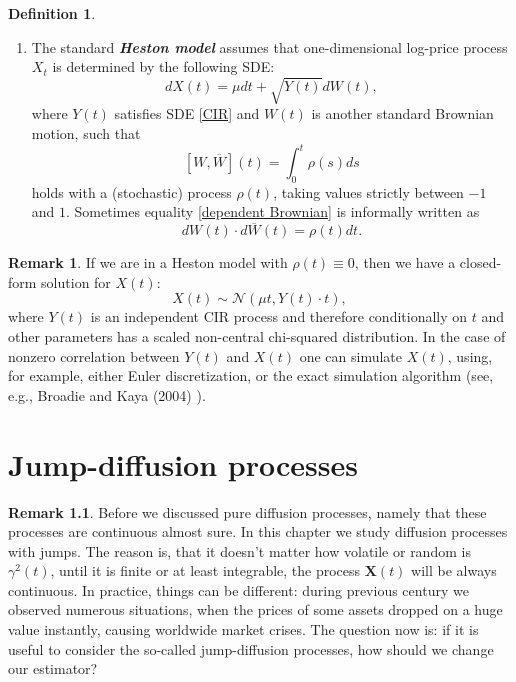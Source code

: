 \documentclass[a4paper,11pt]{book}
\theoremstyle{plain}
\theoremstyle{definition}
\newtheorem{defn}[thm]{Definition}
\newtheorem{rmrk}[thm]{Remark}
\newcommand{\define}[1]{\textit{\textbf{#1}}}
\begin{document}
\begin{defn}
\begin{enumerate}
    		\item The standard \define{Heston model} assumes that one-dimensional log-price process $X_t$ is determined by the following SDE:
    		\begin{equation}
    		dX(t) = \mu dt + \sqrt{Y(t)}d{W}(t),
    		\end{equation}
    		where $Y(t)$ satisfies SDE \eqref{CIR} and ${W}(t)$ is another standard Brownian motion, such that 
    		\begin{equation} \label{dependent Brownian}
    		[{W}, \overline{W}](t) = \int_{0}^{t}\rho(s) ds
    		\end{equation}
    		holds with a (stochastic) process $\rho(t)$, taking values strictly between $-1$ and $1$. Sometimes equality \eqref{dependent Brownian} is informally written as
    		\[ d{W}(t)\cdot d\overline{W}(t) = \rho(t) dt. \]
    	\end{enumerate}
    \end{defn}
    
    \begin{rmrk}
    	If we are in a Heston model with $\rho(t) \equiv 0$, then we have a closed-form solution for $X(t)$:
    	\[ X(t) \sim \mathcal{N}(\mu t, Y(t) \cdot t ), \]
    	where $Y(t)$ is an independent CIR process and therefore conditionally on $t$ and other parameters has a scaled non-central chi-squared distribution. In the case of nonzero correlation between $Y(t)$ and $X(t)$ one can simulate $X(t)$, using, for example, either Euler discretization, or the exact simulation algorithm (see, e.g., Broadie and Kaya (2004) \cite{Broadie}).
    \end{rmrk}
    
    
    \chapter{Jump-diffusion processes}
    \begin{rmrk}
    	Before we discussed pure diffusion processes, namely that these processes are continuous almost sure. In this chapter we study diffusion processes with jumps. The reason is, that it doesn't matter how volatile or random is $\gamma^2(t)$, until it is finite or at least integrable, the process $\mathbf{X}(t)$ will be always continuous. In practice, things can be different: during previous century we observed numerous situations, when the prices of some assets dropped on a huge value instantly, causing worldwide market crises. The question now is: if it is useful to consider the so-called jump-diffusion processes, how should we change our estimator?
    \end{rmrk}
    
\end{document}
